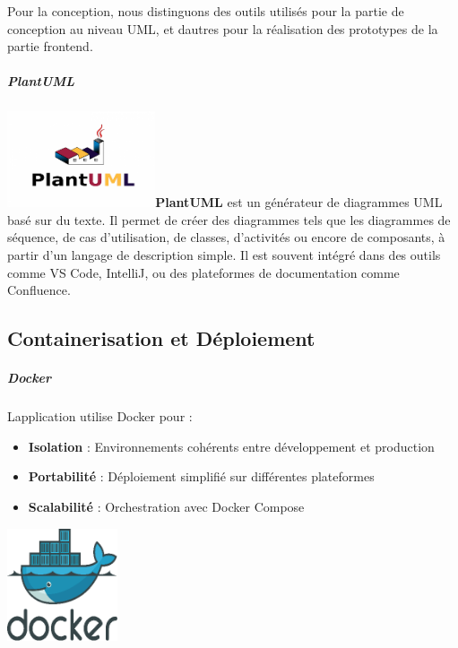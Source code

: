 \documentclass[12pt,a4paper,twoside,openright]{report}
\begin{document}
Pour la conception, nous distinguons des outils utilisés pour la partie
de conception au niveau UML, et d\textquotesingle autres pour la
réalisation des prototypes de la partie frontend.

\hypertarget{plantuml}{%
\subparagraph{PlantUML~}\label{plantuml}}

\includegraphics[width=1.72222in,height=1.11389in]{latex_media/media/image37.png}\textbf{PlantUML}
est un générateur de diagrammes UML basé sur du texte. Il permet de
créer des diagrammes tels que les diagrammes de séquence, de cas
d'utilisation, de classes, d'activités ou encore de composants, à partir
d'un langage de description simple. Il est souvent intégré dans des
outils comme VS Code, IntelliJ, ou des plateformes de documentation
comme Confluence.

\hypertarget{containerisation-et-duxe9ploiement}{%
\subsection{Containerisation et
Déploiement}\label{containerisation-et-duxe9ploiement}}

\hypertarget{docker}{%
\subparagraph{Docker}\label{docker}}

L\textquotesingle application utilise Docker pour :

\begin{itemize}
\item
  \textbf{Isolation} : Environnements cohérents entre développement et
  production
\item
  \textbf{Portabilité} : Déploiement simplifié sur différentes
  plateformes
\item
  \textbf{Scalabilité} : Orchestration avec Docker Compose
\end{itemize}

\includegraphics[width=1.28125in,height=1.31126in]{latex_media/media/image38.png}
\end{document}
